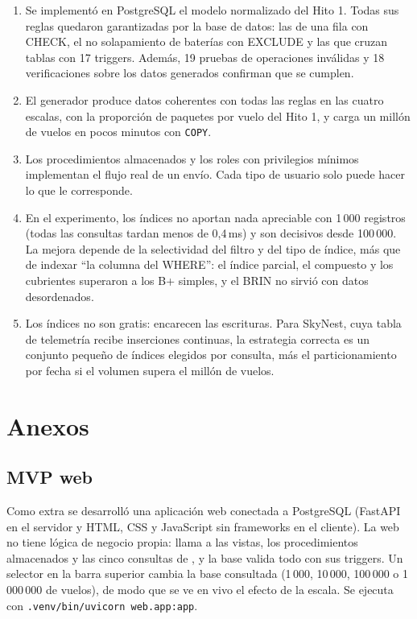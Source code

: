 \begin{enumerate}[label=\arabic*.]
\item Se implementó en PostgreSQL el modelo normalizado del Hito 1. Todas sus reglas quedaron garantizadas por la base de datos: las de una fila con CHECK, el no solapamiento de baterías con EXCLUDE y las que cruzan tablas con 17 triggers. Además, 19 pruebas de operaciones inválidas y 18 verificaciones sobre los datos generados confirman que se cumplen.
\item El generador produce datos coherentes con todas las reglas en las cuatro escalas, con la proporción de paquetes por vuelo del Hito 1, y carga un millón de vuelos en pocos minutos con \texttt{COPY}.
\item Los procedimientos almacenados y los roles con privilegios mínimos implementan el flujo real de un envío. Cada tipo de usuario solo puede hacer lo que le corresponde.
\item En el experimento, los índices no aportan nada apreciable con 1\,000 registros (todas las consultas tardan menos de 0,4\,ms) y son decisivos desde 100\,000. La mejora depende de la selectividad del filtro y del tipo de índice, más que de indexar ``la columna del WHERE'': el índice parcial, el compuesto y los cubrientes superaron a los B+ simples, y el BRIN no sirvió con datos desordenados.
\item Los índices no son gratis: encarecen las escrituras. Para SkyNest, cuya tabla de telemetría recibe inserciones continuas, la estrategia correcta es un conjunto pequeño de índices elegidos por consulta, más el particionamiento por fecha si el volumen supera el millón de vuelos.
\end{enumerate}

\section{Anexos}

\subsection{MVP web}
\label{sec:mvp}
Como extra se desarrolló una aplicación web conectada a PostgreSQL (FastAPI en el servidor y HTML, CSS y JavaScript sin frameworks en el cliente). La web no tiene lógica de negocio propia: llama a las vistas, los procedimientos almacenados y las cinco consultas de , y la base valida todo con sus triggers. Un selector en la barra superior cambia la base consultada (1\,000, 10\,000, 100\,000 o 1\,000\,000 de vuelos), de modo que se ve en vivo el efecto de la escala. Se ejecuta con \texttt{.venv/bin/uvicorn web.app:app}.

